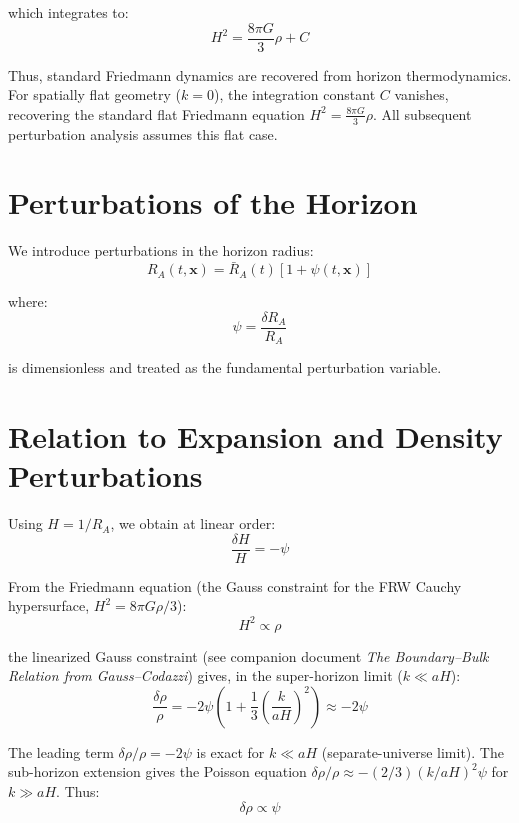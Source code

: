 \documentclass[12pt,a4paper]{article}
\begin{document}
which integrates to:
\begin{equation}
H^2 = \frac{8\pi G}{3}\rho + C \tag{11}
\end{equation}

Thus, standard Friedmann dynamics are recovered from horizon thermodynamics. For spatially flat geometry ($k = 0$), the integration constant $C$ vanishes, recovering the standard flat Friedmann equation $H^2 = \frac{8\pi G}{3}\rho$. All subsequent perturbation analysis assumes this flat case.

\section{Perturbations of the Horizon}

We introduce perturbations in the horizon radius:
\begin{equation}
R_A(t, \mathbf{x}) = \bar{R}_A(t)\left[1 + \psi(t, \mathbf{x})\right] \tag{12}
\end{equation}

where:
\begin{equation}
\psi = \frac{\delta R_A}{R_A} \tag{13}
\end{equation}

is dimensionless and treated as the fundamental perturbation variable.

\section{Relation to Expansion and Density Perturbations}

Using $H = 1/R_A$, we obtain at linear order:
\begin{equation}
\frac{\delta H}{H} = -\psi \tag{14}
\end{equation}

From the Friedmann equation (the Gauss constraint for the FRW Cauchy hypersurface, $H^2 = 8\pi G\rho/3$):
\begin{equation}
H^2 \propto \rho \tag{15}
\end{equation}

the linearized Gauss constraint (see companion document \textit{The Boundary--Bulk Relation from Gauss--Codazzi}) gives, in the super-horizon limit ($k \ll aH$):
\begin{equation}
\frac{\delta\rho}{\rho} = -2\psi\!\left(1 + \frac{1}{3}\!\left(\frac{k}{aH}\right)^{\!2}\right) \approx -2\psi \tag{16}
\end{equation}

The leading term $\delta\rho/\rho = -2\psi$ is exact for $k \ll aH$ (separate-universe limit). The sub-horizon extension gives the Poisson equation $\delta\rho/\rho \approx -(2/3)(k/aH)^2\psi$ for $k \gg aH$. Thus:
\begin{equation}
\delta\rho \propto \psi \tag{17}
\end{equation}
\end{document}
